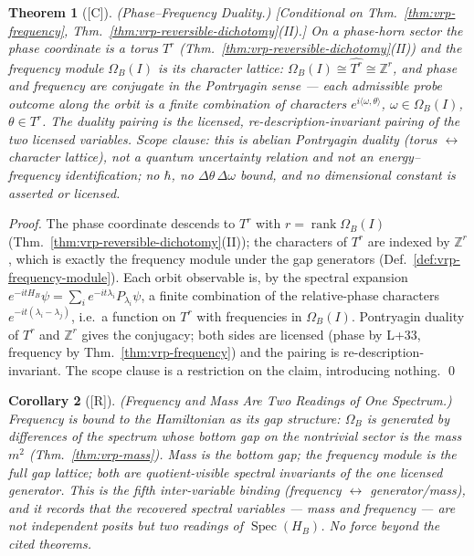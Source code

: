 \documentclass[12pt,oneside]{amsbook}
\theoremstyle{plain}
\newtheorem{theorem}{Theorem}[section]
\newtheorem{corollary}[theorem]{Corollary}
\theoremstyle{definition}
\theoremstyle{remark}
\newcommand{\status}[1]{\textup{[#1]}}
\begin{document}
\begin{theorem}[\status{C}]\label{thm:vrp-phase-frequency-duality}
\textup{(Phase--Frequency Duality.)}
\textup{[Conditional on Thm.~\ref{thm:vrp-frequency},
Thm.~\ref{thm:vrp-reversible-dichotomy}(II).]}
On a phase-horn sector the phase coordinate is a torus $T^r$
(Thm.~\ref{thm:vrp-reversible-dichotomy}(II)) and the frequency module
$\Omega_B(I)$ is its character lattice: $\Omega_B(I) \cong
\widehat{T^r} \cong \mathbb{Z}^r$, and phase and frequency are
\emph{conjugate} in the Pontryagin sense --- each admissible probe
outcome along the orbit is a finite combination of characters
$e^{i\langle \omega, \theta\rangle}$, $\omega\in\Omega_B(I)$,
$\theta\in T^r$.  The duality pairing is the licensed,
re-description-invariant pairing of the two licensed variables.
\emph{Scope clause:} this is abelian Pontryagin duality (torus
$\leftrightarrow$ character lattice), \emph{not} a quantum uncertainty
relation and \emph{not} an energy--frequency identification; no
$\hbar$, no $\Delta\theta\,\Delta\omega$ bound, and no dimensional
constant is asserted or licensed.
\end{theorem}

\begin{proof}
The phase coordinate descends to $T^r$ with $r = \operatorname{rank}
\Omega_B(I)$ (Thm.~\ref{thm:vrp-reversible-dichotomy}(II)); the
characters of $T^r$ are indexed by $\mathbb{Z}^r$, which is exactly the
frequency module under the gap generators (Def.~\ref{def:vrp-frequency-module}).
Each orbit observable is, by the spectral expansion
$e^{-itH_B}\psi=\sum_i e^{-it\lambda_i}P_{\lambda_i}\psi$, a finite
combination of the relative-phase characters $e^{-it(\lambda_i-\lambda_j)}$,
i.e.\ a function on $T^r$ with frequencies in $\Omega_B(I)$.  Pontryagin
duality of $T^r$ and $\mathbb{Z}^r$ gives the conjugacy; both sides are
licensed (phase by L+33, frequency by Thm.~\ref{thm:vrp-frequency}) and
the pairing is re-description-invariant.  The scope clause is a
restriction on the claim, introducing nothing. \qed
\end{proof}

\begin{corollary}[\status{R}]\label{cor:vrp-frequency-energy-binding}
\textup{(Frequency and Mass Are Two Readings of One Spectrum.)}
Frequency is bound to the Hamiltonian as its gap structure: $\Omega_B$
is generated by differences of the spectrum whose bottom gap on the
nontrivial sector is the mass $m^2$ (Thm.~\ref{thm:vrp-mass}).  Mass is
the bottom gap; the frequency module is the full gap lattice; both are
quotient-visible spectral invariants of the one licensed generator.
This is the fifth inter-variable binding (frequency $\leftrightarrow$
generator/mass), and it records that the recovered spectral variables
--- mass and frequency --- are not independent posits but two readings
of $\operatorname{Spec}(H_B)$.  No force beyond the cited theorems.
\end{corollary}
\end{document}
